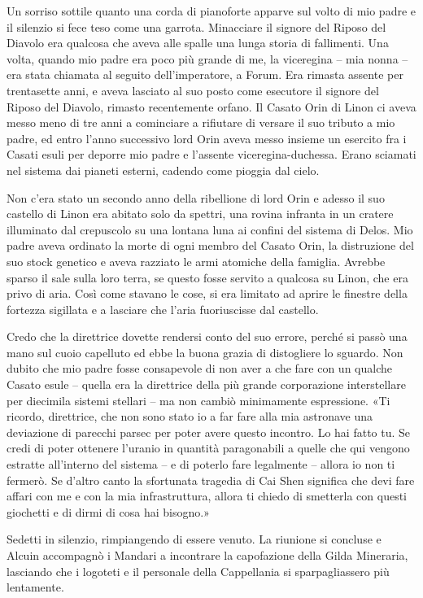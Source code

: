 Un sorriso sottile quanto una corda di pianoforte apparve sul volto di
mio padre e il silenzio si fece teso come una garrota. Minacciare il
signore del Riposo del Diavolo era qualcosa che aveva alle spalle una
lunga storia di fallimenti. Una volta, quando mio padre era poco più
grande di me, la viceregina -- mia nonna -- era stata chiamata al
seguito dell'imperatore, a Forum. Era rimasta assente per trentasette
anni, e aveva lasciato al suo posto come esecutore il signore del Riposo
del Diavolo, rimasto recentemente orfano. Il Casato Orin di Linon ci
aveva messo meno di tre anni a cominciare a rifiutare di versare il suo
tributo a mio padre, ed entro l'anno successivo lord Orin aveva messo
insieme un esercito fra i Casati esuli per deporre mio padre e l'assente
viceregina-duchessa. Erano sciamati nel sistema dai pianeti esterni,
cadendo come pioggia dal cielo.

Non c'era stato un secondo anno della ribellione di lord Orin e adesso
il suo castello di Linon era abitato solo da spettri, una rovina
infranta in un cratere illuminato dal crepuscolo su una lontana luna ai
confini del sistema di Delos. Mio padre aveva ordinato la morte di ogni
membro del Casato Orin, la distruzione del suo stock genetico e aveva
razziato le armi atomiche della famiglia. Avrebbe sparso il sale sulla
loro terra, se questo fosse servito a qualcosa su Linon, che era privo
di aria. Così come stavano le cose, si era limitato ad aprire le
finestre della fortezza sigillata e a lasciare che l'aria fuoriuscisse
dal castello.

Credo che la direttrice dovette rendersi conto del suo errore, perché si
passò una mano sul cuoio capelluto ed ebbe la buona grazia di
distogliere lo sguardo. Non dubito che mio padre fosse consapevole di
non aver a che fare con un qualche Casato esule -- quella era la
direttrice della più grande corporazione interstellare per diecimila
sistemi stellari -- ma non cambiò minimamente espressione. «Ti ricordo,
direttrice, che non sono stato io a far fare alla mia astronave una
deviazione di parecchi parsec per poter avere questo incontro. Lo hai
fatto tu. Se credi di poter ottenere l'uranio in quantità paragonabili a
quelle che qui vengono estratte all'interno del sistema -- e di poterlo
fare legalmente -- allora io non ti fermerò. Se d'altro canto la
sfortunata tragedia di Cai Shen significa che devi fare affari con me e
con la mia infrastruttura, allora ti chiedo di smetterla con questi
giochetti e di dirmi di cosa hai bisogno.»

Sedetti in silenzio, rimpiangendo di essere venuto. La riunione si
concluse e Alcuin accompagnò i Mandari a incontrare la capofazione della
Gilda Mineraria, lasciando che i logoteti e il personale della
Cappellania si sparpagliassero più lentamente.

